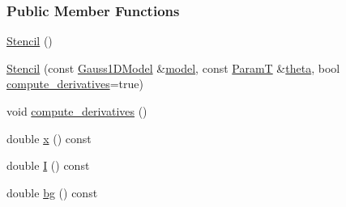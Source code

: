 \subsubsection*{Public Member Functions}
\begin{DoxyCompactItemize}
\item 
\hyperlink{classmappel_1_1Gauss1DModel_1_1Stencil_a66878efbd3a4d99940d963fbb7b144d1}{Stencil} ()
\item 
\hyperlink{classmappel_1_1Gauss1DModel_1_1Stencil_a6881e128436697dd57b41d20a1c8b56e}{Stencil} (const \hyperlink{classmappel_1_1Gauss1DModel}{Gauss1\+D\+Model} \&\hyperlink{classmappel_1_1Gauss1DModel_1_1Stencil_a22c7f0f7fd29ee1cc587f331ef186c76}{model}, const \hyperlink{classmappel_1_1Gauss1DModel_1_1Stencil_a861a81c7bbd677e31bf3ab20467a2adc}{ParamT} \&\hyperlink{classmappel_1_1Gauss1DModel_1_1Stencil_a2428fa45a83396cad7861fbeea44a86a}{theta}, bool \hyperlink{classmappel_1_1Gauss1DModel_1_1Stencil_a4bc1fdd7b3c4df021ac4a519c4e659f8}{compute\+\_\+derivatives}=true)
\item 
void \hyperlink{classmappel_1_1Gauss1DModel_1_1Stencil_a4bc1fdd7b3c4df021ac4a519c4e659f8}{compute\+\_\+derivatives} ()
\item 
double \hyperlink{classmappel_1_1Gauss1DModel_1_1Stencil_a07ab730c1e3945631c8899a5289fffba}{x} () const 
\item 
double \hyperlink{classmappel_1_1Gauss1DModel_1_1Stencil_a2c254393720d2b7d499b8e93390e5580}{I} () const 
\item 
double \hyperlink{classmappel_1_1Gauss1DModel_1_1Stencil_a402ee3f3b26f9190a866acbe567e3ebf}{bg} () const 
\end{DoxyCompactItemize}

